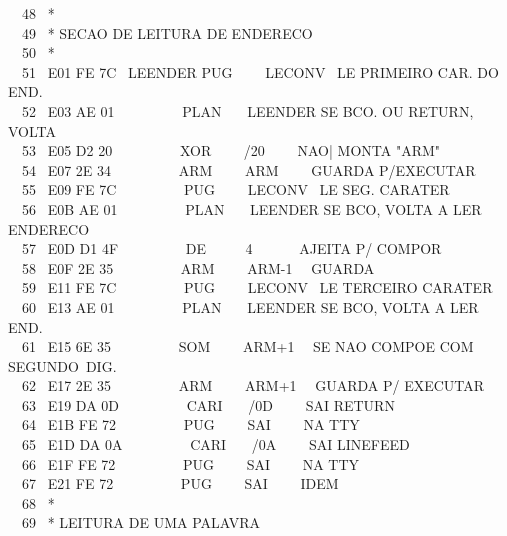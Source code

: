 \documentclass[a4paper,12pt]{article}
\begin{document}
\phantom \ \ 48 \ *\\
\phantom \ \ 49 \ * SECAO DE LEITURA DE ENDERECO\\
\phantom \ \ 50 \ *\\
\phantom \ \ 51 \ E01 FE 7C \ LEENDER PUG \ \ \ \ LECONV \ LE PRIMEIRO CAR. DO END.\\
\phantom \ \ 52 \ E03 AE 01 \ \ \ \ \ \ \ \ \ PLAN \ \ \ LEENDER SE BCO. OU RETURN, VOLTA\\
\phantom \ \ 53 \ E05 D2 20 \ \ \ \ \ \ \ \ \ XOR \ \ \ \ /20 \ \ \ \ NAO| MONTA "ARM"\\
\phantom \ \ 54 \ E07 2E 34 \ \ \ \ \ \ \ \ \ ARM \ \ \ \ ARM \ \ \ \ GUARDA P/EXECUTAR\\
\phantom \ \ 55 \ E09 FE 7C \ \ \ \ \ \ \ \ \ PUG \ \ \ \ LECONV \ LE SEG. CARATER\\
\phantom \ \ 56 \ E0B AE 01 \ \ \ \ \ \ \ \ \ PLAN \ \ \ LEENDER SE BCO, VOLTA A LER ENDERECO\\
\phantom \ \ 57 \ E0D D1 4F \ \ \ \ \ \ \ \ \ DE \ \ \ \ \ 4 \ \ \ \ \ \ AJEITA P/ COMPOR\\
\phantom \ \ 58 \ E0F 2E 35 \ \ \ \ \ \ \ \ \ ARM \ \ \ \ ARM-1 \ \ GUARDA\\
\phantom \ \ 59 \ E11 FE 7C \ \ \ \ \ \ \ \ \ PUG \ \ \ \ LECONV \ LE TERCEIRO CARATER\\
\phantom \ \ 60 \ E13 AE 01 \ \ \ \ \ \ \ \ \ PLAN \ \ \ LEENDER SE BCO, VOLTA A LER END.\\
\phantom \ \ 61 \ E15 6E 35 \ \ \ \ \ \ \ \ \ SOM \ \ \ \ ARM+1 \ \ SE NAO COMPOE COM SEGUNDO\,\,\,DIG.\\
\phantom \ \ 62 \ E17 2E 35 \ \ \ \ \ \ \ \ \ ARM \ \ \ \ ARM+1 \ \ GUARDA P/ EXECUTAR\\
\phantom \ \ 63 \ E19 DA 0D \ \ \ \ \ \ \ \ \ CARI \ \ \ /0D \ \ \ \ SAI RETURN\\
\phantom \ \ 64 \ E1B FE 72 \ \ \ \ \ \ \ \ \ PUG \ \ \ \ SAI \ \ \ \ NA TTY\\
\phantom \ \ 65 \ E1D DA 0A \ \ \ \ \ \ \ \ \ CARI \ \ \ /0A \ \ \ \ SAI LINEFEED\\
\phantom \ \ 66 \ E1F FE 72 \ \ \ \ \ \ \ \ \ PUG \ \ \ \ SAI \ \ \ \ NA TTY\\
\phantom \ \ 67 \ E21 FE 72 \ \ \ \ \ \ \ \ \ PUG \ \ \ \ SAI \ \ \ \ IDEM\\
\phantom \ \ 68 \ *\\
\phantom \ \ 69 \ * LEITURA DE UMA PALAVRA

\newpage

\noindent \\[2em]
\end{document}
